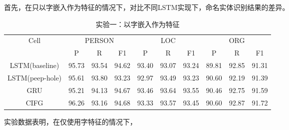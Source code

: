 首先，在只以字嵌入作为特征的情况下，对比不同LSTM实现下，命名实体识别结果的差异。
\begin{table}[H]
    \centering
    \caption{实验一：以字嵌入作为特征}
    \begin{tabular}{cccccccccc}
        \toprule
            \multirow{2}{*}{Cell} &\multicolumn{3}{c}{PERSON} &\multicolumn{3}{c}{LOC} &\multicolumn{3}{c}{ORG}\\
            \cmidrule(lr){2-4} \cmidrule(lr){5-7} \cmidrule(lr){8-10}
            & P & R & F1 & P & R & F1 & P & R & F1\\
        \midrule
        LSTM(baseline) & 95.73 & 93.54 & 94.62 & 93.40 & 93.07 & 93.24 & 89.81 & 92.85 & 91.31\\
        LSTM(peep-hole) & 95.61 & 93.80 & 93.23 & 92.97 & 93.49 & 93.23 & 90.60 & 92.19 & 91.39\\
        GRU & 95.21 & 94.13 & 94.67 & 93.46 & 93.64 & 93.55 & 90.46 & 92.75 & 91.59\\
        CIFG  & 96.26 & 93.16 & 94.68 & 93.33 & 93.57 & 93.45 & 90.60 & 92.87 & 91.72\\
        \bottomrule
    \end{tabular}
    \label{tab:tab1}
\end{table}
实验数据表明，在仅使用字特征的情况下，

